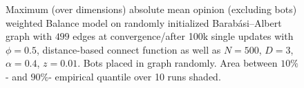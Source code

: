 \documentclass[11pt]{article}
\begin{document}
\begin{figure}[!htb]
\begin{center}
\end{center}
\caption{
Maximum (over dimensions) absolute mean opinion (excluding bots) weighted Balance model on randomly initialized Barabási–Albert graph with $499$ edges at convergence/after 100k single updates with $\phi=0.5$, distance-based connect function as well as $N=500$, $D=3$, $\alpha=0.4$, $z=0.01$. Bots placed in graph randomly. Area between $10\%$- and $90\%$- empirical quantile over 10 runs shaded. 
}
\label{bots_mean_dynamic}
\end{figure}
\end{document}
